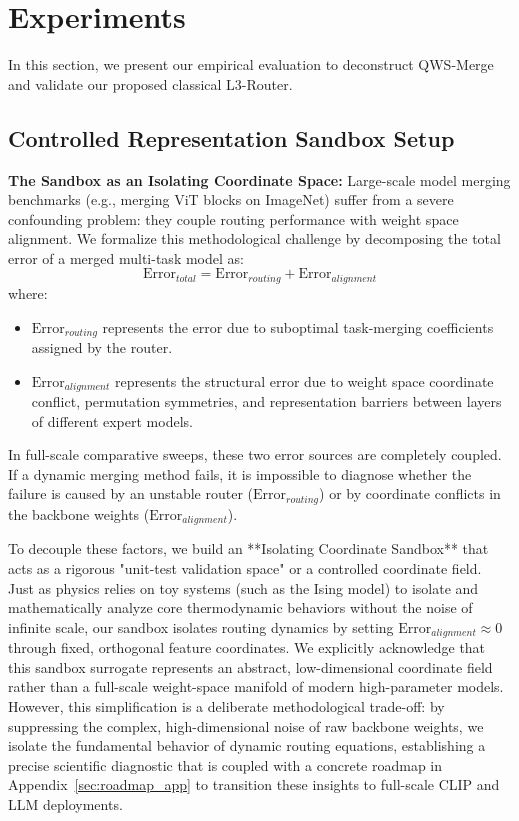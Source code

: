 \section{Experiments}
\label{sec:experiments}

In this section, we present our empirical evaluation to deconstruct QWS-Merge and validate our proposed classical L3-Router.

\subsection{Controlled Representation Sandbox Setup}
\label{subsec:setup}
\textbf{The Sandbox as an Isolating Coordinate Space:} Large-scale model merging benchmarks (e.g., merging ViT blocks on ImageNet) suffer from a severe confounding problem: they couple routing performance with weight space alignment. We formalize this methodological challenge by decomposing the total error of a merged multi-task model as:
\begin{equation}
    \text{Error}_{total} = \text{Error}_{routing} + \text{Error}_{alignment}
\end{equation}
where:
\begin{itemize}
    \item $\text{Error}_{routing}$ represents the error due to suboptimal task-merging coefficients assigned by the router.
    \item $\text{Error}_{alignment}$ represents the structural error due to weight space coordinate conflict, permutation symmetries, and representation barriers between layers of different expert models.
\end{itemize}
In full-scale comparative sweeps, these two error sources are completely coupled. If a dynamic merging method fails, it is impossible to diagnose whether the failure is caused by an unstable router ($\text{Error}_{routing}$) or by coordinate conflicts in the backbone weights ($\text{Error}_{alignment}$). 

To decouple these factors, we build an **Isolating Coordinate Sandbox** that acts as a rigorous "unit-test validation space" or a controlled coordinate field. Just as physics relies on toy systems (such as the Ising model) to isolate and mathematically analyze core thermodynamic behaviors without the noise of infinite scale, our sandbox isolates routing dynamics by setting $\text{Error}_{alignment} \approx 0$ through fixed, orthogonal feature coordinates. We explicitly acknowledge that this sandbox surrogate represents an abstract, low-dimensional coordinate field rather than a full-scale weight-space manifold of modern high-parameter models. However, this simplification is a deliberate methodological trade-off: by suppressing the complex, high-dimensional noise of raw backbone weights, we isolate the fundamental behavior of dynamic routing equations, establishing a precise scientific diagnostic that is coupled with a concrete roadmap in Appendix~\ref{sec:roadmap_app} to transition these insights to full-scale CLIP and LLM deployments.

